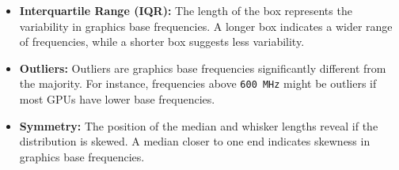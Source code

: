 \documentclass{article}
\begin{document}
\begin{itemize}
\begin{itemize}
\begin{itemize}
				\item \textbf{Interquartile Range (IQR):} The length of the box represents the variability in graphics base frequencies. A longer box indicates a wider range of frequencies, while a shorter box suggests less variability.
				\item \textbf{Outliers:} Outliers are graphics base frequencies significantly different from the majority. For instance, frequencies above \texttt{600 MHz} might be outliers if most GPUs have lower base frequencies.
				\item \textbf{Symmetry:} The position of the median and whisker lengths reveal if the distribution is skewed. A median closer to one end indicates skewness in graphics base frequencies.
			\end{itemize}
		\end{itemize}
	\end{itemize}
\end{document}
